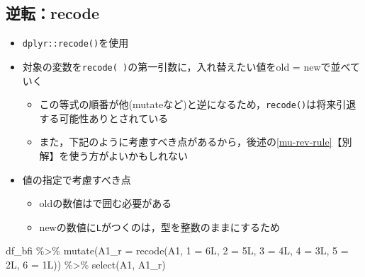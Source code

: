\documentclass[
  xelatex,ja=standard, b5paper]{bxjsbook}
\newenvironment{Shaded}{\begin{snugshade}}{\end{snugshade}}
\newcommand{\AttributeTok}[1]{\textcolor[rgb]{0.77,0.63,0.00}{#1}}
\newcommand{\FunctionTok}[1]{\textcolor[rgb]{0.00,0.00,0.00}{#1}}
\newcommand{\NormalTok}[1]{#1}
\newcommand{\OtherTok}[1]{\textcolor[rgb]{0.56,0.35,0.01}{#1}}
\newcommand{\SpecialCharTok}[1]{\textcolor[rgb]{0.00,0.00,0.00}{#1}}
\newcommand{\StringTok}[1]{\textcolor[rgb]{0.31,0.60,0.02}{#1}}
\providecommand{\tightlist}{%
  \setlength{\itemsep}{0pt}\setlength{\parskip}{0pt}}
\begin{document}
\hypertarget{mu-rev-recode}{%
\subsection{逆転：recode}\label{mu-rev-recode}}

\begin{itemize}
\tightlist
\item
  \texttt{dplyr::recode()}を使用
\item
  対象の変数を\texttt{recode(\ )}の第一引数に，入れ替えたい値をold = newで並べていく

  \begin{itemize}
  \tightlist
  \item
    この等式の順番が他(mutateなど)と逆になるため，\texttt{recode()}は将来引退する可能性ありとされている
  \item
    また，下記のように考慮すべき点があるから，後述の\ref{mu-rev-rule}【別解】を使う方がよいかもしれない
  \end{itemize}
\item
  値の指定で考慮すべき点

  \begin{itemize}
  \tightlist
  \item
    oldの数値は\texttt{}で囲む必要がある
  \item
    newの数値に\texttt{L}がつくのは，型を整数のままにするため
  \end{itemize}
\end{itemize}

\begin{Shaded}
\begin{Highlighting}[]
\NormalTok{df\_bfi }\SpecialCharTok{\%\textgreater{}\%} 
  \FunctionTok{mutate}\NormalTok{(}\AttributeTok{A1\_r =} \FunctionTok{recode}\NormalTok{(A1, }\StringTok{\textasciigrave{}}\AttributeTok{1}\StringTok{\textasciigrave{}} \OtherTok{=}\NormalTok{ 6L, }\StringTok{\textasciigrave{}}\AttributeTok{2}\StringTok{\textasciigrave{}} \OtherTok{=}\NormalTok{ 5L, }\StringTok{\textasciigrave{}}\AttributeTok{3}\StringTok{\textasciigrave{}} \OtherTok{=}\NormalTok{ 4L,      }
                           \StringTok{\textasciigrave{}}\AttributeTok{4}\StringTok{\textasciigrave{}} \OtherTok{=}\NormalTok{ 3L, }\StringTok{\textasciigrave{}}\AttributeTok{5}\StringTok{\textasciigrave{}} \OtherTok{=}\NormalTok{ 2L, }\StringTok{\textasciigrave{}}\AttributeTok{6}\StringTok{\textasciigrave{}} \OtherTok{=}\NormalTok{ 1L)) }\SpecialCharTok{\%\textgreater{}\%} 
  \FunctionTok{select}\NormalTok{(A1, A1\_r)}
\end{Highlighting}
\end{Shaded}
\end{document}
